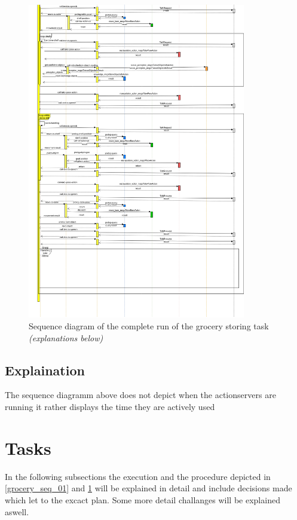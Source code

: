 \documentclass[main.tex]{subfiles}
\begin{document}
		\begin{figure}	
			\centering
			\includegraphics[width=0.85\textwidth]{pictures/diagramms/second-part-grocery-sequence.png}
			\caption{Sequence diagram of the complete run of the grocery storing task \textit{(explanations below)}}
			\label{grocery_seq_02}
		\end{figure}
	
	\subsection{Explaination}
	
		The sequence diagramm above does not depict when the actionservers are running it rather displays the time they are actively used

	\section{Tasks}
	In the following subsections the execution and the procedure depicted in \ref{grocery_seq_01} and \ref{grocery_seq_02} will be explained in detail and include decisions made which let to the excact plan. Some more detail challanges will be explained aswell.
\end{document}
